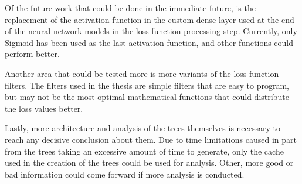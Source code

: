 Of the future work that could be done in the immediate future, is the replacement of the activation function in the custom dense layer used at the end of the neural network models in the loss function processing step.
Currently, only Sigmoid has been used as the last activation function, and other functions could perform better.

Another area that could be tested more is more variants of the loss function filters.
The filters used in the thesis are simple filters that are easy to program, but may not be the most optimal mathematical functions that could distribute the loss values better.

Lastly, more architecture and analysis of the trees themselves is necessary to reach any decisive conclusion about them.
Due to time limitations caused in part from the trees taking an excessive amount of time to generate, only the cache used in the creation of the trees could be used for analysis.
Other, more good or bad information could come forward if more analysis is conducted.
